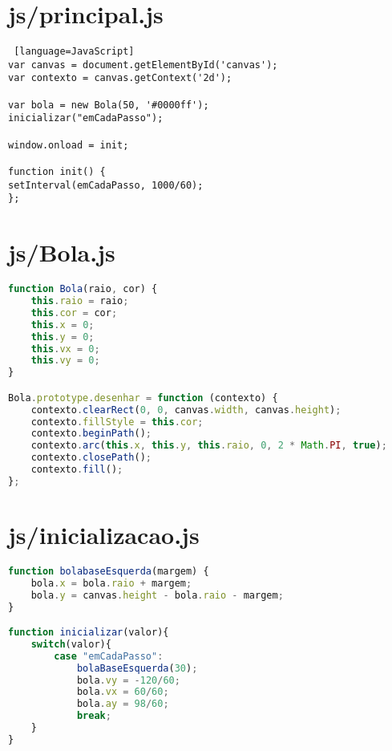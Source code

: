 \documentclass[12pt,a4paper,oneside]{article}
\begin{document}
\section*{js/principal.js}

\begin{lstlisting} [language=JavaScript]
var canvas = document.getElementById('canvas');
var contexto = canvas.getContext('2d');

var bola = new Bola(50, '#0000ff');
inicializar("emCadaPasso");

window.onload = init;

function init() {
setInterval(emCadaPasso, 1000/60);
};
\end{lstlisting}

\newpage

\section*{js/Bola.js}

\begin{lstlisting}[language=JavaScript]
function Bola(raio, cor) {
	this.raio = raio;
	this.cor = cor;
	this.x = 0;
	this.y = 0;
	this.vx = 0;
	this.vy = 0;
}

Bola.prototype.desenhar = function (contexto) {
	contexto.clearRect(0, 0, canvas.width, canvas.height);
	contexto.fillStyle = this.cor;
	contexto.beginPath();
	contexto.arc(this.x, this.y, this.raio, 0, 2 * Math.PI, true);
	contexto.closePath();
	contexto.fill();
};
\end{lstlisting}

\section*{js/inicializacao.js}

\begin{lstlisting}[language=JavaScript]
function bolabaseEsquerda(margem) {
	bola.x = bola.raio + margem;
	bola.y = canvas.height - bola.raio - margem;
}

function inicializar(valor){
	switch(valor){
		case "emCadaPasso":
			bolaBaseEsquerda(30);
			bola.vy = -120/60; 
			bola.vx = 60/60;
			bola.ay = 98/60;
			break;
	}
}
\end{lstlisting}
\end{document}
